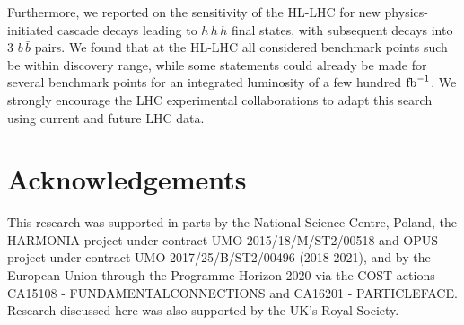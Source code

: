 \documentclass[11pt, a4paper]{appolb}
\newcommand{\fb}{{\ensuremath\rm fb}\xspace}
\begin{document}
Furthermore, we reported on the sensitivity of the HL-LHC for {new physics-}initiated cascade decays leading to ${h}\,{h}\,{h}$ final states, with subsequent decays into 3 $b\,\bar{b}$ pairs. We found that at the HL-LHC all considered benchmark points such be within discovery range, while some statements could already be made for several benchmark points for an integrated luminosity of a few hundred $\fb^{-1}$. We strongly encourage the LHC experimental collaborations to adapt this search using current and future LHC data.

\section*{Acknowledgements}
This research was supported in parts by the National Science Centre, Poland, the
HARMONIA project under contract UMO-2015/18/M/ST2/00518 and
OPUS project under contract UMO-2017/25/B/ST2/00496 (2018-2021), {and by the European Union through the Programme Horizon 2020 via the COST actions CA15108 - FUNDAMENTALCONNECTIONS and CA16201 - PARTICLEFACE.} 
Research discussed here was also supported by the UK's Royal Society.

%
%

\end{document}
